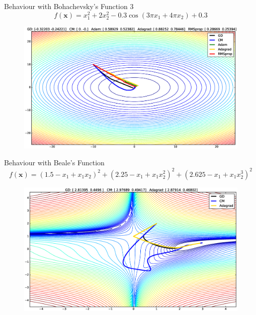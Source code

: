 \documentclass[10pt]{beamer}
\newcommand{\xbold}{\mathbf{x}}
\begin{document}
\begin{frame}{Behaviour with Bohachevsky's Function 3}
\begin{equation}
\label{B3}
f(\xbold) = x_{1}^{2} + 2x_{2}^{2} - 0.3\cos(3\pi x_{1} + 4\pi x_{2}) + 0.3
\end{equation}
\begin{figure}
\centering
\includegraphics[width=\linewidth]{./images/B3.eps}
\end{figure}
\end{frame}

\begin{frame}{Behaviour with Beale's Function}
\begin{equation}
\label{BL}
f(\xbold) = (1.5 - x_{1} + x_{1}x_{2})^{2} + (2.25 - x_{1} + x_{1}x_{2}^{2})^{2} + (2.625 - x_{1} + x_{1}x_{2}^{3})^{2}
\end{equation}
\begin{figure}
\centering
\includegraphics[width=\linewidth]{./images/BL.eps}
\end{figure}
\end{frame}
\end{document}
